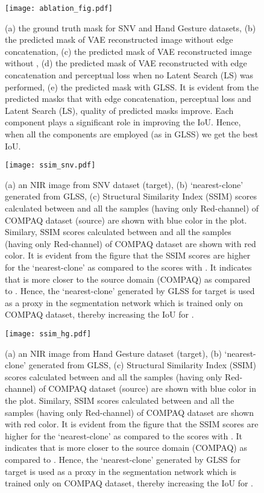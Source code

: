\documentclass[runningheads]{llncs}
\begin{document}
\begin{figure}[h]
\begin{center}
    \texttt{[image: ablation\_fig.pdf]}
\caption{(a) the ground truth mask for SNV and Hand Gesture datasets, (b) the predicted mask of VAE reconstructed image without edge concatenation, (c) the predicted mask of VAE reconstructed  image without ,
(d) the predicted mask of VAE reconstructed with edge concatenation and perceptual loss when no Latent Search (LS) was performed, 
 (e) the predicted mask with GLSS.
 It is evident from the predicted masks that with edge concatenation, perceptual loss and Latent Search (LS), quality of predicted masks improve. Each component plays a significant role in improving the IoU. Hence, when all the components are employed (as in GLSS) we get the best IoU.}
\label{fig:LatentSearch}
\end{center}
\end{figure}
\begin{figure}[h]
\begin{center}
    \hspace*{-1cm}\texttt{[image: ssim\_snv.pdf]}
\caption{(a) an NIR image  from SNV dataset (target), (b) `nearest-clone'  generated from GLSS, (c) Structural Similarity Index (SSIM) scores calculated between  and all the samples (having only Red-channel) of COMPAQ dataset (source) are shown with blue color in the plot. Similary, SSIM scores calculated between  and all the samples (having only Red-channel) of COMPAQ dataset are shown with red color. It is evident from the figure that the SSIM scores are higher for the `nearest-clone'  as compared to the scores with . It indicates that  is more closer to the source domain (COMPAQ) as compared to . Hence, the `nearest-clone'  generated by GLSS for target  is used as a proxy in the segmentation network  which is trained only on COMPAQ dataset, thereby increasing the IoU for .}
 \label{fig:LatentSearch}
\end{center}
\end{figure}
\begin{figure}[h]
\begin{center}
    \hspace*{-2cm}\texttt{[image: ssim\_hg.pdf]}
\caption{(a) an NIR image  from Hand Gesture dataset (target), (b) `nearest-clone'  generated from GLSS, (c) Structural Similarity Index (SSIM) scores calculated between  and all the samples (having only Red-channel) of COMPAQ dataset (source) are shown with blue color in the plot. Similary, SSIM scores calculated between  and all the samples (having only Red-channel) of COMPAQ dataset are shown with red color. It is evident from the figure that the SSIM scores are higher for the `nearest-clone'  as compared to the scores with . It indicates that  is more closer to the source domain (COMPAQ) as compared to . Hence, the `nearest-clone'  generated by GLSS for target  is used as a proxy in the segmentation network  which is trained only on COMPAQ dataset, thereby increasing the IoU for .}
 
 \label{fig:LatentSearch}
\end{center}
\end{figure}
\end{document}
